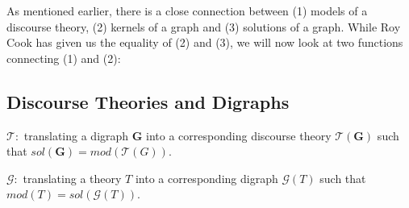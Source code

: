 As mentioned earlier, there is a close connection between (1) models of a discourse theory, (2) kernels of a graph and (3) solutions of a graph.  While Roy Cook has given us the equality of (2) and (3), we will now look at two functions connecting (1) and (2):
\subsection{Discourse Theories and Digraphs}
\label{sub:Discourse Theories and Digraphs}

$\mathcal{T}:$ translating a digraph \textbf{G} into a corresponding discourse theory $\mathcal{T}(\mathbf{G})$ such that $sol(\mathbf{G}) = mod(\mathcal{T}(G))$.

$\mathcal{G}:$ translating a theory $T$ into a corresponding digraph $\mathcal{G}(T)$ such that $mod(T) = sol(\mathcal{G}(T))$.
